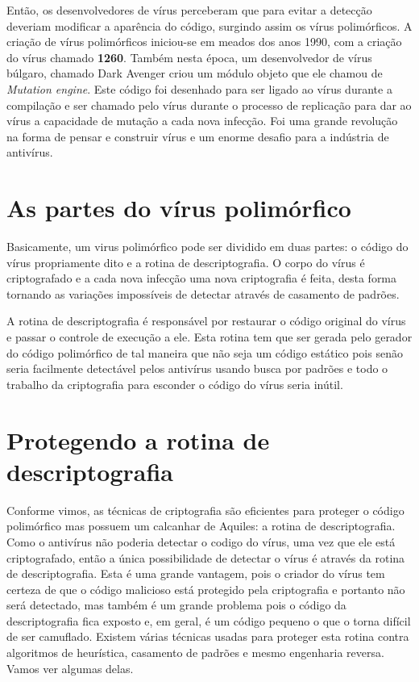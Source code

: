 Então, os desenvolvedores de vírus perceberam que para evitar a detecção deveriam modificar a aparência do código, surgindo assim os vírus polimórficos. A criação de vírus polimórficos iniciou-se em meados dos anos 1990, com a criação do vírus chamado \textbf{1260}\cite{wiki:8}. Também nesta época, um desenvolvedor de vírus búlgaro, chamado Dark Avenger\cite{wiki:9} criou um módulo objeto que ele chamou de \textit{Mutation engine}. Este código foi desenhado para ser ligado ao vírus durante a compilação e ser chamado pelo vírus durante o processo de replicação para dar ao vírus a capacidade de mutação a cada nova infecção. Foi uma grande revolução na forma de pensar e construir vírus e um enorme desafio para a indústria de antivírus. 

\section{As partes do vírus polimórfico}
Basicamente, um virus polimórfico pode ser dividido em duas partes: o código do vírus propriamente dito e a rotina de descriptografia. O corpo do vírus é criptografado e a cada nova infecção uma nova criptografia é feita, desta forma tornando as variações impossíveis de detectar através de casamento de padrões.

A rotina de descriptografia é responsável por restaurar o código original do vírus e passar o controle de execução a ele. Esta rotina tem que ser gerada pelo gerador do código polimórfico de tal maneira que não seja um código estático pois senão seria facilmente detectável pelos antivírus usando busca por padrões e todo o trabalho da criptografia para esconder o código do vírus seria inútil.

\section{Protegendo a rotina de descriptografia}
Conforme vimos, as técnicas de criptografia são eficientes para proteger o código polimórfico mas possuem um calcanhar de Aquiles: a rotina de descriptografia. Como o antivírus não poderia detectar o codigo do vírus, uma vez que ele está criptografado, então a única possibilidade de detectar o vírus é através da rotina de descriptografia. Esta é uma grande vantagem, pois o criador do vírus tem certeza de que o código malicioso está protegido pela criptografia e portanto não será detectado, mas também é um grande problema pois o código da descriptografia fica exposto e, em geral, é um código pequeno o que o torna difícil de ser camuflado. Existem várias técnicas usadas para proteger esta rotina contra algoritmos de heurística, casamento de padrões e mesmo engenharia reversa. Vamos ver algumas delas.

